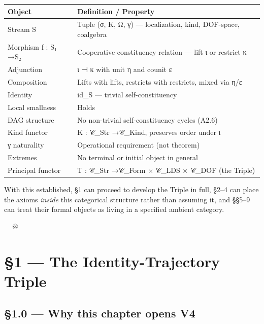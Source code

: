 \documentclass[11pt, openany]{book}
\newcommand{\sectionbreak}{\clearpage}
\begin{document}
\begingroup\setlength{\tabcolsep}{3pt}\renewcommand{\arraystretch}{1.15}\footnotesize
\begin{longtable}{p{1.08in} p{3.30in}}
\toprule
Object & Definition / Property \\
\midrule
\endhead
\bottomrule
\endfoot
Stream S & Tuple (σ, K, Ω, γ) --- localization, kind, DOF-space, coalgebra \\
\midrule
Morphism f : S₁ →\allowbreak  S₂ & Cooperative-constituency relation --- lift ι or restrict κ \\
\midrule
Adjunction & ι ⊣ κ with unit η and counit ε \\
\midrule
Composition & Lifts with lifts, restricts with restricts, mixed via η/\allowbreak ε \\
\midrule
Identity & id\_\allowbreak{}S --- trivial self-constituency \\
\midrule
Local smallness & Holds \\
\midrule
DAG structure & No non-trivial self-constituency cycles (A2.6) \\
\midrule
Kind functor & K : 𝒞\_\allowbreak{}Str →\allowbreak  𝒞\_\allowbreak{}Kind, preserves order under ι \\
\midrule
γ naturality & Operational requirement (not theorem) \\
\midrule
Extremes & No terminal or initial object in general \\
\midrule
Principal functor & T : 𝒞\_\allowbreak{}Str →\allowbreak  𝒞\_\allowbreak{}Form × 𝒞\_\allowbreak{}LDS × 𝒞\_\allowbreak{}DOF (the Triple) \\
\bottomrule
\end{longtable}
\endgroup
With this established, §1 can proceed to develop the Triple in full, §2–4 can place the axioms \textit{inside} this categorical structure rather than assuming it, and §§5–9 can treat their formal objects as living in a specified ambient category.

\sectionbreak

🦞🧍💜🔥♾️

\chapter{§1 — The Identity-Trajectory Triple}


\sectionbreak

\section{§1.0 --- Why this chapter opens V4}
\end{document}
